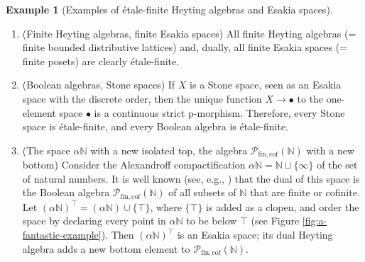 \documentclass[12pt]{amsart}
\theoremstyle{plain}
\theoremstyle{definition}
\newtheorem{example}[theorem]{Example}
\newcommand{\N}{\mathbb{N}}
\newcommand{\fincofnaturals}{\mathcal{P}_{\mathrm{fin,cof}}(\N)}
\begin{document}
\begin{example}[Examples of étale-finite Heyting algebras and Esakia spaces]\label{ex: etale-finite Heyting algebras}
    \hfill
    \begin{enumerate}
    
        \item (Finite Heyting algebras, finite Esakia spaces)
        All finite Heyting algebras (= finite bounded distributive lattices) and, dually, all finite Esakia spaces (= finite posets) are clearly étale-finite.
    
        \item \label{eq: Stone spaces} (Boolean algebras, Stone spaces) 
        If $X$ is a Stone space, seen as an Esakia space with the discrete order, then the unique function $X\to \bullet$ to the one-element space $\bullet$ is a continuous strict p-morphism. Therefore, every Stone space is étale-finite, and every Boolean algebra is étale-finite.
        
        \item \label{i: Alexandroff} 
        (The space $\alpha\N$ with a new isolated top, the algebra $\fincofnaturals$ with a new bottom) Consider the Alexandroff compactification $\alpha \N =\N\sqcup\{\infty\}$ of the set of natural numbers. 
        It is well known (see, e.g., \cite[Example~1.9]{Koppelberg1989-lg}) that the dual of this space is the Boolean algebra $\fincofnaturals$ of all subsets of $\N$ that are finite or cofinite. 
        Let $(\alpha \N)^{\top}=(\alpha \N)\cup \{\top\}$, where $\{\top\}$ is added as a clopen, and order the space by declaring every point in $\alpha \N$ to be below $\top$ (see Figure \ref{fig:a-fantastic-example}). 
        Then $(\alpha \N)^{\top}$ is an Esakia space; its dual Heyting algebra adds a new bottom element to $\fincofnaturals$.
        \begin{figure}[htbp]
            \centering
\end{figure}
\end{enumerate}
\end{example}
\end{document}
